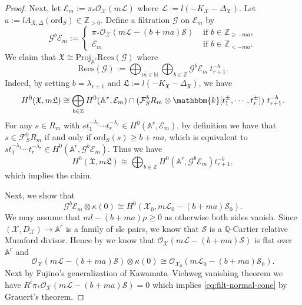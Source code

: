 \documentclass[reqno, 12pt]{amsart}
\theoremstyle{definition}
\newcommand{\bA}{\mathbb{A}}
\newcommand{\bQ}{\mathbb{Q}}
\newcommand{\bZ}{\mathbb{Z}}
\newcommand{\bN}{\mathbb{N}}
\newcommand{\bk}{\mathbbm{k}}
\newcommand{\cX}{\mathcal{X}}
\newcommand{\cO}{\mathcal{O}}
\newcommand{\cL}{\mathcal{L}}
\newcommand{\cF}{\mathcal{F}}
\newcommand{\cG}{\mathcal{G}}
\newcommand{\cE}{\mathcal{E}}
\newcommand{\cS}{\mathcal{S}}
\newcommand{\ord}{\mathrm{ord}}
\newcommand{\Proj}{\mathrm{Proj}}
\newcommand{\fX}{\mathfrak{X}}
\newcommand{\fL}{\mathfrak{L}}
\newcommand{\Rees}{\mathrm{Rees}}
\numberwithin{equation}{section}
\begin{document}
\begin{proof}
Next, let $\cE_m:= \pi_* \cO_{\cX}(m\cL)$ where $\cL:= l(-K_{\cX}-\Delta_{\cX})$. Let $a:=lA_{X,\Delta}(\ord_S) \in \bZ_{>0}$. Define a filtration $\cG$ on $\cE_m$ by
\[
\cG^b \cE_m:= \begin{cases} \pi_* \cO_{\cX}(m\cL - (b+ma)\cS) & \textrm{ if }b\in \bZ_{\geq -ma},\\
\cE_m & \textrm{ if }b\in \bZ_{< -ma}.
\end{cases}
\]
We claim that $\fX \cong \Proj_{\bA^r} \Rees(\cG)$ where 
\[
\Rees(\cG) := \bigoplus_{m\in \bN}\bigoplus_{b\in \bZ} \cG^b \cE_m~ t_{r+1}^{-b}.
\]
Indeed, by setting $b=\lambda_{r+1}$ and $\fL:=l(-K_{\fX}-\Delta_{\fX})$, we have 
\[
H^0(\fX, m\fL) \cong \bigoplus_{b\in \bZ} H^0(\bA^r,\cE_m) \cap (\cF_S^b R_m \otimes \bk[t_1^{\pm}, \cdots, t_r^{\pm}])~ t_{r+1}^{-b}.
\]
For any $s\in R_m$ with $s t_1^{-\lambda_1}\cdots t_r^{-\lambda_r} \in H^0(\bA^r, \cE_m)$, by definition we have that $s\in \cF_S^b R_m$ if and only if $\ord_S(s) \geq b+ma$, which is equivalent to $s t_1^{-\lambda_1}\cdots t_r^{-\lambda_r} \in H^0(\bA^r, \cG^b \cE_m)$. Thus we have 
\[
H^0(\fX, m\fL)\cong \bigoplus_{b\in\bZ} H^0(\bA^r, \cG^b \cE_m) t_{r+1}^{-b},
\]
which implies the claim.

Next, we show that 
\begin{equation}\label{eq:filt-normal-cone}
    \cG^b \cE_m \otimes \kappa (0) \cong H^0(\cX_0, m\cL_0 - (b+ma) \cS_0).
\end{equation}
We may assume that $ml -(b+ma)\rho \geq 0$ as otherwise both sides vanish.  Since $(\cX,D_{\cX}) \to \bA^r$ is a family of slc pairs, we know that $\cS$ is a $\bQ$-Cartier relative Mumford divisor. Hence by \cite[Corollary 4.33]{Kol-modbook} we know that $\cO_{\cX}(m\cL - (b+ma) \cS)$ is flat over $\bA^r$ and 
\[
\cO_{\cX}(m\cL - (b+ma) \cS) \otimes \kappa(0)\cong \cO_{\cX_0}(m\cL_0 - (b+ma) \cS_0).
\]
Next by Fujino's generalization of Kawamata--Viehweg vanishing theorem \cite[Theorem 1.7]{Fuj14} we have $R^i \pi_* \cO_{\cX}(m\cL - (b+ma) \cS) = 0$ which implies \eqref{eq:filt-normal-cone} by Grauert's theorem. 


\end{proof}
\end{document}
